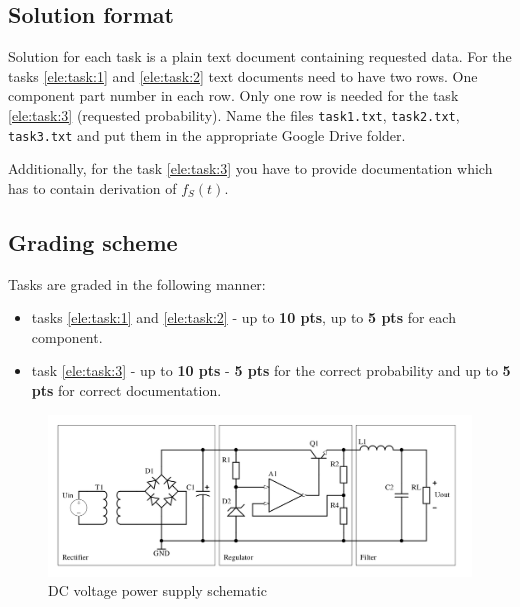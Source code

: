 \documentclass[a4paper]{article}
\begin{document}
\newpage

\subsection{Solution format}
Solution for each task is a plain text document containing requested data. For
the tasks \ref{ele:task:1} and \ref{ele:task:2} text documents need to have 
two rows. One component part number in each row. Only one row is needed for the 
task \ref{ele:task:3} (requested probability). Name the files 
\texttt{task1.txt}, \texttt{task2.txt}, \texttt{task3.txt} and put them in 
the appropriate Google Drive folder.

Additionally, for the task \ref{ele:task:3} you have to provide documentation
which has to contain derivation of $f_S(t)$.

\subsection{Grading scheme}
Tasks are graded in the following manner:
\begin{itemize}
\item tasks \ref{ele:task:1} and \ref{ele:task:2} - up to \textbf{10 pts}, 
up to \textbf{5 pts} for each component.
\item task \ref{ele:task:3} - up to \textbf{10 pts} - \textbf{5 pts} for the 
correct probability and up to \textbf{5 pts} for correct documentation.
\end{itemize}

\begin{figure}
\centering
\includegraphics[width=\linewidth]{images/reg.png}
\caption{DC voltage power supply schematic}
\label{fig:schematic}
\end{figure}
 
\end{document}

